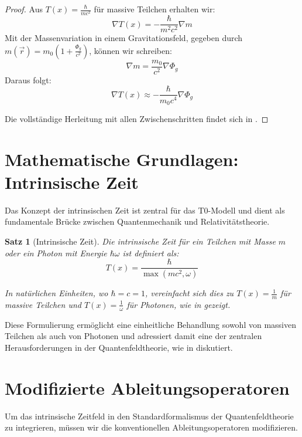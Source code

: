 \documentclass[12pt,a4paper]{article}
\newcommand{\Tfield}{T(x)}
\newtheorem{theorem}{Satz}[section]
\theoremstyle{definition}
\theoremstyle{remark}
\begin{document}
	\begin{proof}
		Aus \( \Tfield = \frac{\hbar}{m c^2} \) für massive Teilchen erhalten wir:
		\begin{equation}
			\nabla \Tfield = -\frac{\hbar}{m^2 c^2} \nabla m
		\end{equation}
		Mit der Massenvariation in einem Gravitationsfeld, gegeben durch \( m(\vec{r}) = m_0 (1 + \frac{\Phi_g}{c^2}) \), können wir schreiben:
		\begin{equation}
			\nabla m = \frac{m_0}{c^2} \nabla \Phi_g
		\end{equation}
		Daraus folgt:
		\begin{equation}
			\nabla \Tfield \approx -\frac{\hbar}{m_0 c^4} \nabla \Phi_g
		\end{equation}
		
		Die vollständige Herleitung mit allen Zwischenschritten findet sich in \cite{pascher_emergente_gravitation_2025}.
	\end{proof}
	
	\section{Mathematische Grundlagen: Intrinsische Zeit}
	Das Konzept der intrinsischen Zeit ist zentral für das T0-Modell und dient als fundamentale Brücke zwischen Quantenmechanik und Relativitätstheorie.
	
	\begin{theorem}[Intrinsische Zeit]
		Die intrinsische Zeit für ein Teilchen mit Masse \(m\) oder ein Photon mit Energie \(\hbar\omega\) ist definiert als:
		\begin{equation}
			\Tfield = \frac{\hbar}{\max(m c^2, \omega)}
		\end{equation}
		
		In natürlichen Einheiten, wo \(\hbar = c = 1\), vereinfacht sich dies zu \(\Tfield = \frac{1}{m}\) für massive Teilchen und \(\Tfield = \frac{1}{\omega}\) für Photonen, wie in \cite{pascher_alpha_2025} gezeigt.
	\end{theorem}
	
	Diese Formulierung ermöglicht eine einheitliche Behandlung sowohl von massiven Teilchen als auch von Photonen und adressiert damit eine der zentralen Herausforderungen in der Quantenfeldtheorie, wie in \cite{pascher_photons_2025} diskutiert.
	
	\section{Modifizierte Ableitungsoperatoren}
	Um das intrinsische Zeitfeld in den Standardformalismus der Quantenfeldtheorie zu integrieren, müssen wir die konventionellen Ableitungsoperatoren modifizieren.
	
\end{document}
